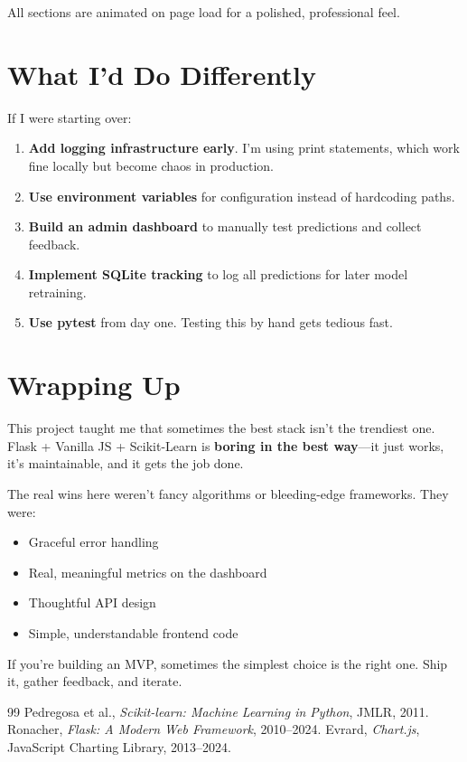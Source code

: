 \documentclass[12pt, a4paper]{article}
\begin{document}
All sections are animated on page load for a polished, professional feel.

\section{What I'd Do Differently}

If I were starting over:

\begin{enumerate}
    \item \textbf{Add logging infrastructure early}. I'm using print statements, which work fine locally but become chaos in production.
    \item \textbf{Use environment variables} for configuration instead of hardcoding paths.
    \item \textbf{Build an admin dashboard} to manually test predictions and collect feedback.
    \item \textbf{Implement SQLite tracking} to log all predictions for later model retraining.
    \item \textbf{Use pytest} from day one. Testing this by hand gets tedious fast.
\end{enumerate}

\section{Wrapping Up}

This project taught me that sometimes the best stack isn't the trendiest one. Flask + Vanilla JS + Scikit-Learn is \textbf{boring in the best way}—it just works, it's maintainable, and it gets the job done.

The real wins here weren't fancy algorithms or bleeding-edge frameworks. They were:

\begin{itemize}
    \item Graceful error handling
    \item Real, meaningful metrics on the dashboard
    \item Thoughtful API design
    \item Simple, understandable frontend code
\end{itemize}

If you're building an MVP, sometimes the simplest choice is the right one. Ship it, gather feedback, and iterate.

\begin{thebibliography}{99}
 Pedregosa et al., \textit{Scikit-learn: Machine Learning in Python}, JMLR, 2011.
 Ronacher, \textit{Flask: A Modern Web Framework}, 2010–2024.
 Evrard, \textit{Chart.js}, JavaScript Charting Library, 2013–2024.
\end{thebibliography}
\end{document}
